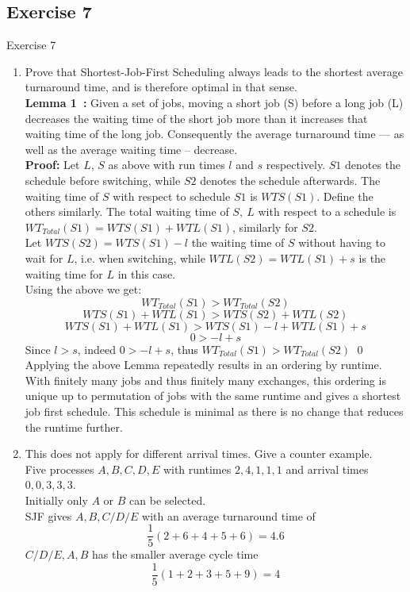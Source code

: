 \documentclass[10pt]{beamer}
\begin{document}
\subsection*{Exercise 7}
\frame{\subsectionpage}
\begin{frame}{Exercise 7}
\begin{enumerate}
		\item%
			Prove that Shortest-Job-First Scheduling always leads to the shortest average turnaround time,
			and is therefore optimal in that sense. \\
    \framebreak
            \textbf{Lemma 1~\autocite{tt}:} Given a set of jobs, moving a short job (S) before a long job (L) decreases the waiting time of the short job more than it increases that waiting time of the long job.
            Consequently the average turnaround time --- as well as the average waiting time -- decrease. \\
            \framebreak
            \textbf{Proof:} Let $L$, $S$ as above with run times $l$ and $s$ respectively. 
            $S1$ denotes the schedule before switching, while $S2$ denotes the schedule afterwards. The waiting time of $S$ with respect to schedule $S1$ is $WTS(S1)$. Define the others similarly. The total waiting time of $S, \ L$ with respect to a schedule is $WT_{Total}(S1) = WTS(S1) + WTL(S1)$, similarly for $S2$. \\
            Let $WTS(S2) = WTS(S1) - l$ the waiting time of $S$ without having to wait for $L$, i.e. when switching, while $WTL(S2) = WTL(S1) + s$ is the waiting time for $L$ in this case. \\
            \framebreak
            Using the above we get:
            \[ WT_{Total}(S1) > WT_{Total}(S2) \]
            \[ WTS(S1) + WTL(S1) > WTS(S2) + WTL(S2) \]
            \[ WTS(S1) + WTL(S1) > WTS(S1) - l + WTL(S1) + s \]
            \[ 0 > - l + s \]
            Since $l > s$, indeed $0 > - l + s$, thus $WT_{Total}(S1) > WT_{Total}(S2)$
			\hfill\qed \\
			\framebreak
			Applying the above Lemma repeatedly results in an ordering by runtime. With finitely many jobs and thus finitely many exchanges, this ordering is unique up to permutation of jobs with the same runtime and gives a shortest job first schedule. This schedule is minimal as there is no change that reduces the runtime further.
    \framebreak
		\item%
			This does not apply for different arrival times.
			Give a counter example. \\
			Five processes $A, B, C, D, E$ with runtimes $2, 4, 1, 1, 1$ and arrival times $0, 0, 3, 3, 3$. \\
			Initially only $A$ or $B$ can be selected. \\
			SJF gives $A, B, C/D/E$
			with an average turnaround time of \[ \frac{1}{5} (2 + 6 + 4 + 5 + 6) = 4.6 \]
			$C/D/E, A, B$ has the smaller average cycle time \[\frac{1}{5} (1 + 2 + 3 + 5 + 9) = 4 \]
	\end{enumerate}
\end{frame}
    
\end{document}
